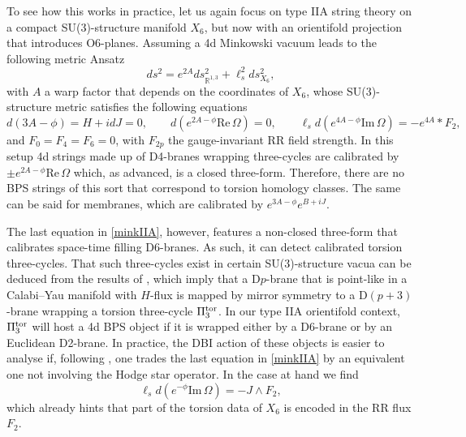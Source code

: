 \documentclass[11pt]{article}
\def\be{\begin{equation}}
\def\ee{\end{equation}}
\def\re{\mbox{Re}\, }
\def\im{\mbox{Im}\, }
\def\Om{\Omega}
\newcommand{\IR}{\mathbb{R}}
\begin{document}
To see how this works in practice, let us again focus on type IIA string theory on a compact SU(3)-structure manifold $X_6$, but now with an orientifold projection that introduces O6-planes. Assuming a 4d Minkowski vacuum leads to the following metric Ansatz
\be
ds^2 = e^{2A} ds^2_{\IR^{1,3}} + \ell_s^2 ds^2_{X_6} ,
\ee
with $A$ a warp factor that depends on the coordinates of $X_6$, whose SU(3)-structure metric satisfies the following equations
\be
d(3A-\phi) = H + idJ = 0 , \qquad d(e^{2A-\phi} {\re \Om}) =0 , \qquad \ell_s d( e^{4A-\phi} {\im \Om}) = - e^{4A} * F_2 ,
\label{minkIIA}
\ee
and $F_0 = F_4 =F_6 =0$, with $F_{2p}$ the gauge-invariant RR field strength. In this setup 4d strings made up of D4-branes wrapping three-cycles are calibrated by $\pm e^{2A-\phi}{\re \Om}$ which, as advanced, is a closed three-form. Therefore, there are no BPS strings of this sort that correspond to torsion homology classes. The same can be said for membranes, which are calibrated by $e^{3A-\phi}e^{B+iJ}$. 

The last equation in \eqref{minkIIA}, however, features a non-closed three-form that calibrates space-time filling D6-branes. As such, it can detect calibrated torsion three-cycles. That such three-cycles exist in certain SU(3)-structure vacua can be deduced from the results of \cite{Tomasiello:2005bp}, which imply that a D$p$-brane that is point-like in a Calabi--Yau manifold with $H$-flux is mapped by mirror symmetry to a D$(p+3)$-brane wrapping a torsion three-cycle $\Pi_3^{\rm tor}$. In our type IIA orientifold context, $\Pi_3^{\rm tor}$ will host a 4d BPS object if it is wrapped either by a D6-brane or by an Euclidean D2-brane. In practice, the DBI action of these objects is easier to analyse if, following \cite{Tomasiello:2007zq}, one trades the last equation in \eqref{minkIIA} by an equivalent one not involving the Hodge star operator. In the case at hand we find \cite{Marchesano:2014iea}
\be
\ell_s d( e^{-\phi} {\im \Om}) = - J \wedge F_2 ,
\label{IIAJF}
\ee
which already hints that part of the torsion data of $X_6$ is encoded in the RR flux $F_2$. 
\end{document}
